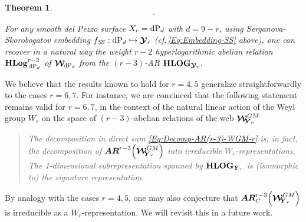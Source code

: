 \documentclass[11pt]{amsart}
\newcommand{\mk}{\medskip}
\newtheorem{thm}{Theorem}[section]
\begin{document}
\begin{thm}
$$  \, .
  $$ 
\item[{\bf 3.}] For any smooth del Pezzo surface $X_r={\rm dP}_{d}$ with $d=9-r$, using Serganova-Skorobogatov embedding $f_{S\hspace{-0.05cm} S}: {\rm dP}_d \hookrightarrow \boldsymbol{\mathcal Y}_r$ (cf.\,\eqref{Eq:Embedding-SS} above), 
one can recover  in a natural way 
the weight $r-2$ hyperlogarithmic abelian relation ${\bf HLog}^{r-2}_{  \hspace{0.05cm} {\rm dP}_d}$ 
of $\boldsymbol{\mathcal W}_{  \hspace{-0.05cm} {\rm dP}_d}$ 
 from the $(r-3)$-AR 
${\bf HLOG}_{ \boldsymbol{\mathcal Y}_r } $. 
\mk
\end{thm}
We believe that the results known to hold for $r = 4, 5$ generalize straightforwardly to the cases $r = 6, 7$. For instance, we are convinced that the following statement remains valid for $r = 6, 7$, in the context of the natural linear action of the Weyl group $W_r$ on the space of $(r-3)$-abelian relations of the web $\boldsymbol{\mathcal W}_{\hspace{-0.1cm} \boldsymbol{Y}_r}^{GM}$
\begin{quote}%
{\it The decomposition in direct sum \eqref{Eq:Decomp-AR(r-3)-WGM-r} is, in fact, the decomposition of $\boldsymbol{AR}^{r-3}\Big( \boldsymbol{\mathcal W}_{\hspace{-0.1cm} \boldsymbol{Y}_r}^{GM}\Big)$ 
into irreducible $W_r$-representations. The 1-dimensional subrepresentation 
spanned by 
 $ {\bf HLOG}_{ \boldsymbol{Y}_r}$ is  (isomorphic to) the signature representation.}
\end{quote}%
By analogy with the cases $r = 4, 5$, one may also conjecture that $\boldsymbol{AR}^{r-3}_C\Big( \boldsymbol{\mathcal W}_{\hspace{-0.1cm} \boldsymbol{Y}_r}^{GM}\Big)$  is irreducible as a $W_r$-representation. We will revisit this  in a future work.


 
\end{document}

